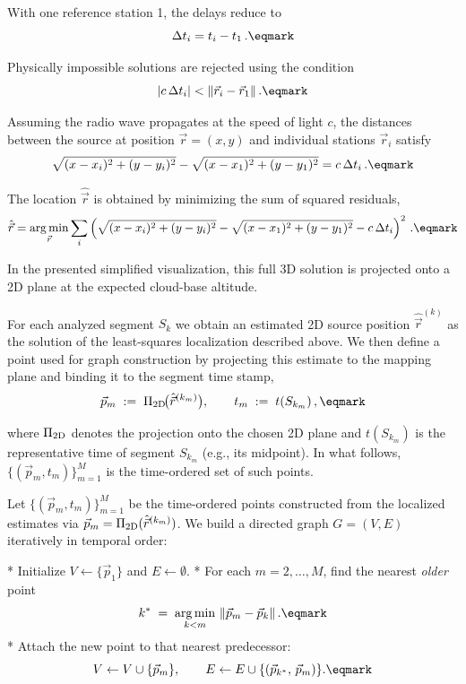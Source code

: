 With one reference station 1, the delays reduce to
$$
\Delta t_i = t_i - t_1 \,.
\eqmark
$$

Physically impossible solutions are rejected using the condition
$$
|c \,\Delta t_i| < \Vert \vec r_i - \vec r_1 \Vert \,.
\eqmark
$$

 Assuming the radio wave propagates at the speed of light $c$, 
the distances between the source at position $\vec r=(x,y)$
and individual stations $\vec r_i$ satisfy
$$
\sqrt{(x - x_i)^2 + (y - y_i)^2} -
\sqrt{(x - x_1)^2 + (y - y_1)^2} = c\,\Delta t_i \,.
\eqmark
$$

The location $\hat{\vec r}$ is obtained by minimizing the sum of squared residuals,
$$
\hat{\vec r} = 
\mathop{\rm arg\,min}_{\vec r} \sum_i
\left(
\sqrt{(x - x_i)^2 + (y - y_i)^2} -
\sqrt{(x - x_1)^2 + (y - y_1)^2} -
c\,\Delta t_i
\right)^2 \,.
\eqmark
$$

In the presented simplified visualization, this full 3D solution
is projected onto a 2D plane at the expected cloud-base altitude.

\medskip
{}
For each analyzed segment $S_k$ we obtain an estimated 2D source position
$\hat{\vec r}^{(k)}$ as the solution of the least-squares localization described above.
We then define a point used for graph construction by projecting this estimate to the
mapping plane and binding it to the segment time stamp,
$$
\vec p_m \;:=\; \Pi_{\rm 2D}\!\bigl(\hat{\vec r}^{(k_m)}\bigr),
\qquad
t_m \;:=\; t(S_{k_m}) \,,
\eqmark
$$

where $\Pi_{\rm 2D}$ denotes the projection onto the chosen 2D plane and
$t(S_{k_m})$ is the representative time of segment $S_{k_m}$ (e.g., its midpoint).
In what follows, $\{\!(\vec p_m,t_m)\!\}_{m=1}^M$ is the time-ordered set of such points.



\baselineskip
{}
Let $\{(\vec p_m, t_m)\}_{m=1}^M$ be the time-ordered points constructed from
the localized estimates via $\vec p_m = \Pi_{\rm 2D}(\hat{\vec r}^{(k_m)})$.
We build a directed graph $G=(V,E)$ iteratively in temporal order:

\begitems
* Initialize $V \gets \{\vec p_1\}$ and $E \gets \emptyset$.
* For each $m=2,\dots,M$, find the nearest {\it older} point
$$
k^\ast \;=\; \mathop{\rm arg\,min}_{k<m}\,\Vert \vec p_m - \vec p_k \Vert \,.
\eqmark
$$
* Attach the new point to that nearest predecessor:
$$
V \gets V \cup \{\vec p_m\}, 
\qquad
E \gets E \cup \{(\vec p_{k^\ast},\,\vec p_m)\}.
\eqmark
$$
\enditems

